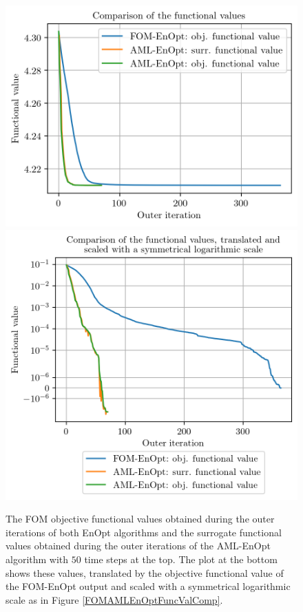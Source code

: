 \begin{figure}
\centering
\includegraphics{Plots/functionalValueCompNT50.png}
\includegraphics{Plots/functionalValueCompSymlogNT50.png}
\caption{\label{FOMAMLEnOptFuncValCompNT50}The FOM objective functional values obtained during the outer iterations of both EnOpt algorithms and the surrogate functional values obtained during the outer iterations of the AML-EnOpt algorithm with $50$ time steps at the top. The plot at the bottom shows these values, translated by the objective functional value of the FOM-EnOpt output and scaled with a symmetrical logarithmic scale as in Figure \ref{FOMAMLEnOptFuncValComp}.}
\end{figure}

